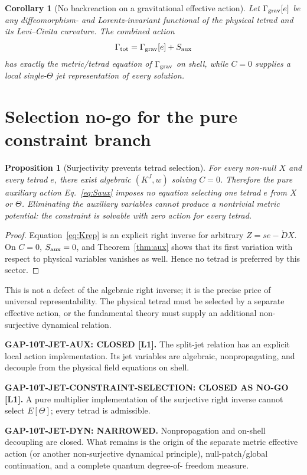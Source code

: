 \documentclass[11pt,a4paper]{article}
\newtheorem{corollary}[theorem]{Corollary}
\newtheorem{proposition}[theorem]{Proposition}
\begin{document}
\begin{corollary}[No backreaction on a gravitational effective action]
Let $\Gamma_{\rm grav}[e]$ be any diffeomorphism- and Lorentz-invariant
functional of the physical tetrad and its Levi--Civita curvature.  The combined
action
\begin{equation}
 \Gamma_{\rm tot}=\Gamma_{\rm grav}[e]+S_{\rm aux}
\end{equation}
has exactly the metric/tetrad equation of $\Gamma_{\rm grav}$ on shell, while
$C=0$ supplies a local single-$\Theta$ jet representation of every solution.
\end{corollary}

\section{Selection no-go for the pure constraint branch}
\begin{proposition}[Surjectivity prevents tetrad selection]\label{prop:noselect}
For every non-null $X$ and every tetrad $e$, there exist algebraic $(K^J,w)$
solving $C=0$.  Therefore the pure auxiliary action Eq.~\eqref{eq:Saux} imposes
no equation selecting one tetrad $e$ from $X$ or $\Theta$.  Eliminating the
auxiliary variables cannot produce a nontrivial metric potential: the
constraint is solvable with zero action for every tetrad.
\end{proposition}

\begin{proof}
Equation~\eqref{eq:Krep} is an explicit right inverse for arbitrary
$Z=s e-\mathring D X$.  On $C=0$, $S_{\rm aux}=0$, and Theorem~\ref{thm:aux}
shows that its first variation with respect to physical variables vanishes as
well.  Hence no tetrad is preferred by this sector.
\end{proof}

This is not a defect of the algebraic right inverse; it is the precise price
of universal representability.  The physical tetrad must be selected by a
separate effective action, or the fundamental theory must supply an additional
non-surjective dynamical relation.

\begin{tcolorbox}[colback=green!6!white,colframe=green!55!black,title=Exact status]
\textbf{GAP-10T-JET-AUX: CLOSED [L1].}
The split-jet relation has an explicit local action implementation.  Its jet
variables are algebraic, nonpropagating, and decouple from the physical field
equations on shell.

\medskip
\textbf{GAP-10T-JET-CONSTRAINT-SELECTION: CLOSED AS NO-GO [L1].}
A pure multiplier implementation of the surjective right inverse cannot select
$E[\Theta]$; every tetrad is admissible.

\medskip
\textbf{GAP-10T-JET-DYN: NARROWED.}
Nonpropagation and on-shell decoupling are closed.  What remains is the origin
of the separate metric effective action (or another non-surjective dynamical
principle), null-patch/global continuation, and a complete quantum degree-of-
freedom measure.
\end{tcolorbox}
\end{document}
